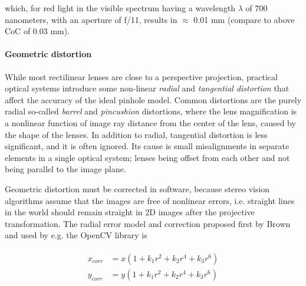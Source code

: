 which, for red light in the visible spectrum having a wavelength $\lambda$ of 700 nanometers, with an aperture of f/11, results in $\approx$ 0.01 mm (compare to above CoC of 0.03 mm).



\paragraph{Geometric distortion}
While most rectilinear lenses are close to a perspective projection, practical optical systems introduce some non-linear \emph{radial} and \emph{tangential distortion} that affect the accuracy of the ideal pinhole model.
Common distortions are the purely radial so-called \emph{barrel} and \emph{pincushion} distortions, where the lens magnification is a nonlinear function of image ray distance from the center of the lens, caused by the shape of the lenses. \cite{brown1966decentering}
In addition to radial, tangential distortion is less significant, and it is often ignored.
Its cause is small misalignments in separate elements in a single optical system; lenses being offset from each other and not being parallel to the image plane. \cite{kingslake1989history}



Geometric distortion must be corrected in software, because stereo vision algorithms assume that the images are free of nonlinear errors, i.e. straight lines in the world should remain straight in 2D images after the projective transformation.
\cite{szeliski10vision}
The radial error model and correction proposed first by Brown \cite{brown1966decentering} and used by e.g. the OpenCV library \cite{opencv} is %

\begin{align} \label{equ:radialdist} \begin{split}
	x_{corr} &= x(1 + k_1 r^2 + k_2 r^4 + k_3 r^6)\\
	y_{corr} &= y(1 + k_1 r^2 + k_2 r^4 + k_3 r^6)
\end{split} \end{align}

